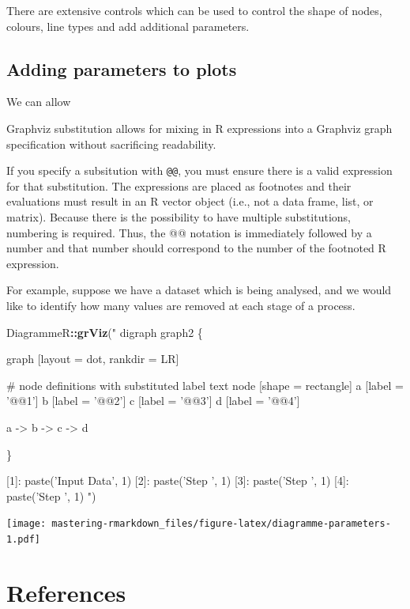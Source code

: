 \documentclass[]{book}
\newenvironment{Shaded}{\begin{snugshade}}{\end{snugshade}}
\newcommand{\KeywordTok}[1]{\textcolor[rgb]{0.13,0.29,0.53}{\textbf{#1}}}
\newcommand{\StringTok}[1]{\textcolor[rgb]{0.31,0.60,0.02}{#1}}
\newcommand{\OperatorTok}[1]{\textcolor[rgb]{0.81,0.36,0.00}{\textbf{#1}}}
\newcommand{\NormalTok}[1]{#1}
\begin{document}
There are extensive controls which can be used to control the shape of
nodes, colours, line types and add additional parameters.

\section{Adding parameters to plots}\label{adding-parameters-to-plots}

We can allow

Graphviz substitution allows for mixing in R expressions into a Graphviz
graph specification without sacrificing readability.

If you specify a subsitution with \texttt{@@}, you must ensure there is
a valid expression for that substitution. The expressions are placed as
footnotes and their evaluations must result in an R vector object (i.e.,
not a data frame, list, or matrix). Because there is the possibility to
have multiple substitutions, numbering is required. Thus, the @@
notation is immediately followed by a number and that number should
correspond to the number of the footnoted R expression.

For example, suppose we have a dataset which is being analysed, and we
would like to identify how many values are removed at each stage of a
process.

\begin{Shaded}
\begin{Highlighting}[]
\NormalTok{DiagrammeR}\OperatorTok{::}\KeywordTok{grViz}\NormalTok{(}\StringTok{"}
\StringTok{digraph graph2 \{}

\StringTok{graph [layout = dot, rankdir = LR]}

\StringTok{# node definitions with substituted label text}
\StringTok{node [shape = rectangle]}
\StringTok{a [label = '@@1']}
\StringTok{b [label = '@@2']}
\StringTok{c [label = '@@3']}
\StringTok{d [label = '@@4']}

\StringTok{a -> b -> c -> d}

\StringTok{\}}

\StringTok{[1]: paste('Input Data', 1)}
\StringTok{[2]: paste('Step ', 1)}
\StringTok{[3]: paste('Step ', 1)}
\StringTok{[4]: paste('Step ', 1)}
\StringTok{"}\NormalTok{)}
\end{Highlighting}
\end{Shaded}

\texttt{[image: mastering-rmarkdown\_files/figure-latex/diagramme-parameters-1.pdf]}

\chapter{References}\label{references}


\end{document}
